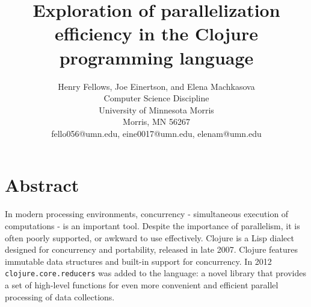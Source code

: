 \documentclass[12pt]{article}
\newcommand{\comment}[1]{{\bf \tt  {#1}}}
\newcommand{\clocode}[1]{{\texttt {#1}}}
\begin{document}
\pagestyle{plain}
%




\title{Exploration of parallelization efficiency in the Clojure programming language}
%
%




\author{
Henry Fellows, Joe Einertson, and Elena Machkasova \\
Computer Science Discipline \\
University of Minnesota Morris\\
Morris, MN 56267\\
fello056@umn.edu, eine0017@umn.edu, elenam@umn.edu
}




\date{}




\maketitle
\thispagestyle{empty}


\section*{\centering Abstract}
In modern processing environments, concurrency - simultaneous execution of computations - is an important tool. %
Despite the importance of parallelism, it is often poorly supported, or awkward to use effectively. Clojure is a Lisp dialect designed for concurrency and portability, 
released in late 2007. Clojure features immutable data structures and built-in support for concurrency. %
In 2012 \clocode{clojure.core.reducers} was added to the language: a novel library that provides a set of high-level functions for even more convenient and efficient parallel processing of data collections. 
\end{document}
